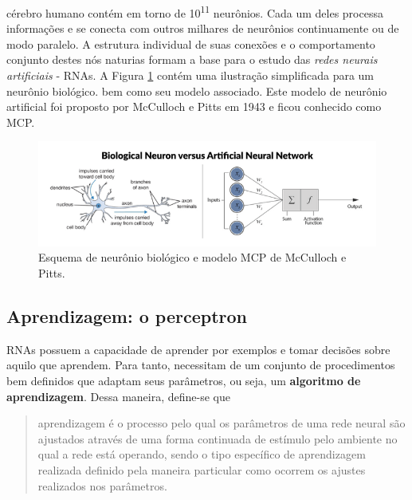 \documentclass[10pt,journal,compsoc]{IEEEtran}
\begin{document}
 cérebro humano contém em torno de 10\textsuperscript{11} neurônios. 
Cada um deles processa informações e se conecta com 
outros milhares de neurônios continuamente ou de modo 
paralelo. A estrutura individual de suas conexões e 
o comportamento conjunto destes nós naturias formam 
a base para o estudo das \textit{redes neurais artificiais} - RNAs.
A Figura \ref{fig:neuronio} contém uma ilustração simplificada
para um neurônio biológico. bem como seu modelo associado. 
Este modelo de neurônio artificial foi proposto por 
McCulloch e Pitts \cite{mcculloch1943logical} em 1943 e 
ficou conhecido como MCP.
\begin{figure}[h!]
  \includegraphics[scale=0.35]{figs/1mcp.png}
  \caption{Esquema de neurônio biológico e modelo MCP de 
  McCulloch e Pitts.}
  \label{fig:neuronio}
\end{figure}

\subsection{Aprendizagem: o perceptron}

RNAs possuem a capacidade de aprender por exemplos e tomar 
decisões sobre aquilo que aprendem. Para tanto, necessitam 
de um conjunto de procedimentos bem definidos que adaptam 
seus parâmetros, ou seja, um \textbf{algoritmo de aprendizagem}. 
Dessa maneira, define-se que

\begin{quotation}
aprendizagem é o processo pelo qual os parâmetros de uma rede
neural são ajustados através de uma forma continuada de estímulo
pelo ambiente no qual a rede está operando, sendo o tipo específico 
de aprendizagem realizada definido pela maneira particular 
como ocorrem os ajustes realizados nos parâmetros.
\end{quotation}
\end{document}
